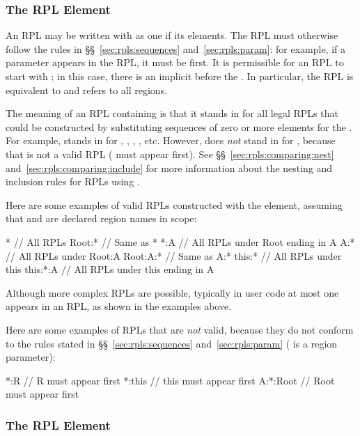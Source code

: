 \subsubsection{The \kwd{*} RPL Element%
\label{sec:rpls:partial:star}}

An RPL may be written with \kwd{*} as one if its elements.  The RPL
must otherwise follow the rules in \S\S~\ref{sec:rpls:sequences}
and~\ref{sec:rpls:param}: for example, if a parameter appears in the
RPL, it must be first.  It is permissible for an RPL to start with
\kwd{*}; in this case, there is an implicit  before the
\kwd{*}.  In particular, the RPL \kwd{*} is equivalent to 
and refers to all regions.

The meaning of an RPL containing \kwd{*} is that it stands in for all
legal RPLs that could be constructed by substituting sequences of zero
or more elements for the \kwd{*}.  For example,  stands in
for , , , , etc.  However,
 does \emph{not} stand in for , because that
is not a valid RPL ( must appear first).  See
\S\S~\ref{sec:rpls:comparing:nest}
and~\ref{sec:rpls:comparing:include} for more information about the
nesting and inclusion rules for RPLs using \kwd{*}.

Here are some examples of valid RPLs constructed with the \kwd{*}
element, assuming that  and  are declared region names
in scope:
%
\begin{dpjlisting}
*          // All RPLs
Root:*     // Same as *
*:A        // All RPLs under Root ending in A
A:*        // All RPLs under Root:A
Root:A:*   // Same as A:*
this:*     // All RPLs under this
this:*:A   // All RPLs under this ending in A
\end{dpjlisting}
%
Although more complex RPLs are possible, typically in user code at
most one \kwd{*} appears in an RPL, as shown in the examples above.

Here are some examples of RPLs that are \emph{not} valid, because they
do not conform to the rules stated in \S\S~\ref{sec:rpls:sequences}
and~\ref{sec:rpls:param} ( is a region parameter):
%
\begin{dpjlisting}
*:R        // R must appear first
*:this     // this must appear first
A:*:Root   // Root must appear first
\end{dpjlisting}


\subsubsection{The \kwd{[?]} RPL Element%
\label{sec:rpls:partial:qmark}}

